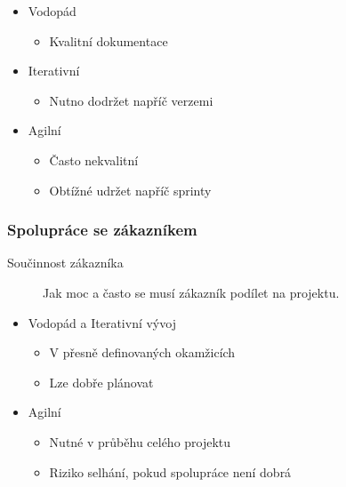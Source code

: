               \begin{itemize}
                \item Vodopád
                  \begin{itemize}
                    \item Kvalitní dokumentace
                  \end{itemize}
                \item Iterativní
                  \begin{itemize}
                    \item Nutno dodržet napříč verzemi
                  \end{itemize}
                \item Agilní
                  \begin{itemize}
                    \item Často nekvalitní
                    \item Obtížné udržet napříč sprinty
                  \end{itemize}
              \end{itemize}

              \subsubsection{Spolupráce se zákazníkem}
                \begin{description}
                  \item[Součinnost zákazníka] Jak moc a často se musí zákazník podílet na projektu.
                \end{description}

                \begin{itemize}
                  \item Vodopád a Iterativní vývoj
                    \begin{itemize}
                      \item V přesně definovaných okamžicích
                      \item Lze dobře plánovat
                    \end{itemize}
                  \item Agilní
                    \begin{itemize}
                      \item Nutné v průběhu celého projektu
                      \item Riziko selhání, pokud spolupráce není dobrá
                    \end{itemize}
                \end{itemize}

